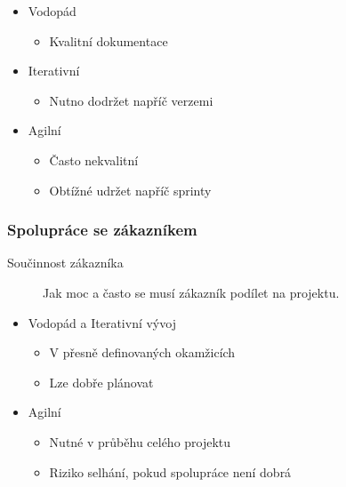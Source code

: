               \begin{itemize}
                \item Vodopád
                  \begin{itemize}
                    \item Kvalitní dokumentace
                  \end{itemize}
                \item Iterativní
                  \begin{itemize}
                    \item Nutno dodržet napříč verzemi
                  \end{itemize}
                \item Agilní
                  \begin{itemize}
                    \item Často nekvalitní
                    \item Obtížné udržet napříč sprinty
                  \end{itemize}
              \end{itemize}

              \subsubsection{Spolupráce se zákazníkem}
                \begin{description}
                  \item[Součinnost zákazníka] Jak moc a často se musí zákazník podílet na projektu.
                \end{description}

                \begin{itemize}
                  \item Vodopád a Iterativní vývoj
                    \begin{itemize}
                      \item V přesně definovaných okamžicích
                      \item Lze dobře plánovat
                    \end{itemize}
                  \item Agilní
                    \begin{itemize}
                      \item Nutné v průběhu celého projektu
                      \item Riziko selhání, pokud spolupráce není dobrá
                    \end{itemize}
                \end{itemize}

